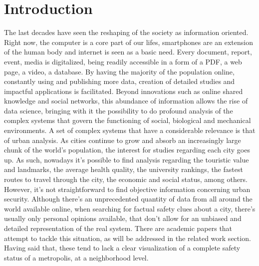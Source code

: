 \documentclass[runningheads]{llncs}
\begin{document}
%
%
%
\newpage
\section{Introduction}

The last decades have seen the reshaping of the society as information oriented. Right now, the computer is a core part of our lifes, smartphones are an extension of the human body and internet is seen as a basic need. Every document, report, event, media is digitalized, being readily accessible in a form of a PDF, a web page, a video, a database. By having the majority of the population online, constantly using and publishing more data, creation of detailed studies and impactful applications is facilitated. Beyond innovations such as online shared knowledge and social networks, this abundance of information allows the rise of data science, bringing with it the possibility to do profound analysis of the complex systems that govern the functioning of social, biological and mechanical environments. A set of complex systems that have a considerable relevance is that of urban analysis. As cities continue to grow and absorb an increasingly large chunk of the world's population, the interest for studies regarding each city goes up. As such, nowadays it's possible to find analysis regarding the touristic value and landmarks, the average health quality, the university rankings, the fastest routes to travel through the city, the economic and social status, among others. However, it's not straightforward to find objective information concerning urban security. Although there's an unprecedented quantity of data from all around the world available online, when searching for factual safety clues about a city, there's usually only personal opinions available, that don't allow for an unbiased and detailed representation of the real system. There are academic papers that attempt to tackle this situation, as will be addressed in the related work section. Having said that, these tend to lack a clear visualization of a complete safety status of a metropolis, at a neighborhood level.
\end{document}
